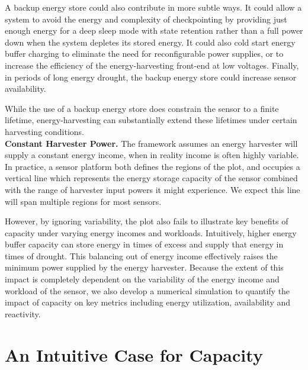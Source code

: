 A backup energy store could also contribute in more subtle ways. It could
allow a system to avoid the energy and complexity of checkpointing by
providing just enough energy for a deep sleep mode with state retention rather
than a full power down when the system depletes its stored energy. It could also
cold start energy buffer charging to eliminate the need for reconfigurable
power supplies, or to increase the efficiency of
the energy-harvesting front-end at low voltages.
Finally, in periods of long energy drought, the backup energy store could increase
sensor availability.

While the use of a backup energy store
does constrain the sensor to a finite lifetime,
energy-harvesting can substantially extend these lifetimes under certain harvesting
conditions.\\

\vspace{-6pt}
\noindent
\textbf{Constant Harvester Power.}
The framework assumes an energy harvester will supply a constant energy
income, when in reality income is often highly variable. In practice, a sensor
platform both defines the regions of the plot, and occupies a
vertical line which represents the energy storage capacity of the sensor
combined with the range of harvester input powers it might experience. We expect
this line will span multiple regions for most sensors.

However, by ignoring variability, the plot also fails to illustrate key benefits
of capacity under varying energy incomes and workloads. Intuitively,
higher energy buffer capacity can store energy in times of excess and supply
that energy in times of drought. This balancing out of energy income
effectively raises the minimum power supplied by the energy harvester.
Because the extent of this impact is completely dependent on the variability
of the energy income and workload of the sensor, we also develop a numerical simulation to
quantify the impact of capacity
on key metrics including energy utilization, availability and reactivity.

\section{An Intuitive Case for Capacity}

